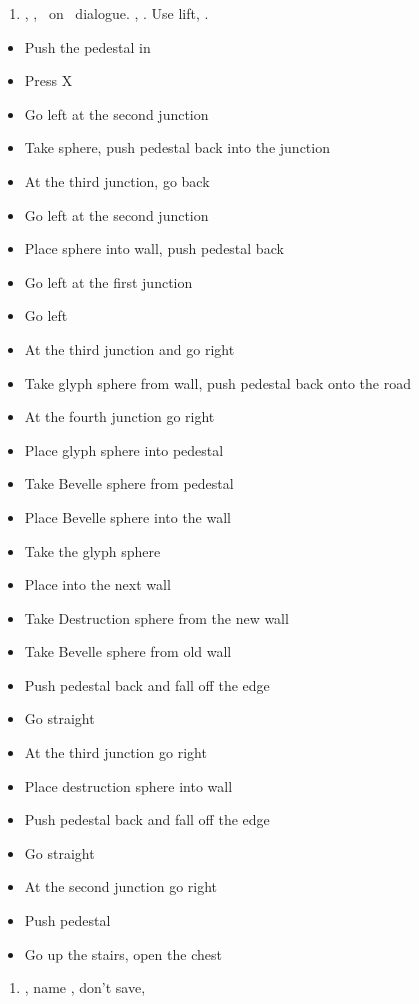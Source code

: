 \begin{enumerate}[resume]
	\item \sd, \fmv[1:30], \sd\ on \yuna\ dialogue. \skippablefmv[30], \sd. Use lift, \sd.
\end{enumerate}
\vfill
\begin{trial}
\begin{itemize}
	\item Push the pedestal in
	\item Press X
	\item Go left at the second junction
	\item Take sphere, push pedestal back into the junction
	\item At the third junction, go back
	\item Go left at the second junction
	\item Place sphere into wall, push pedestal back
	\item Go left at the first junction
	\item Go left
	\item At the third junction and go right
	\item Take glyph sphere from wall, push pedestal back onto the road
	\item At the fourth junction go right
	\item Place glyph sphere into pedestal
	\item Take Bevelle sphere from pedestal
	\item Place Bevelle sphere into the wall
	\item Take the glyph sphere
	\item Place into the next wall
	\item Take Destruction sphere from the new wall %
	\item Take Bevelle sphere from old wall
	\item Push pedestal back and fall off the edge
	\item Go straight
	\item At the third junction go right
	\item Place destruction sphere into wall
	\item Push pedestal back and fall off the edge
	\item Go straight
	\item At the second junction go right
	\item Push pedestal
	\item Go up the stairs, open the chest
\end{itemize}
\end{trial}
\begin{enumerate}[resume]
	\item \sd, name \bahamut, don't save, \sd
\end{enumerate}
